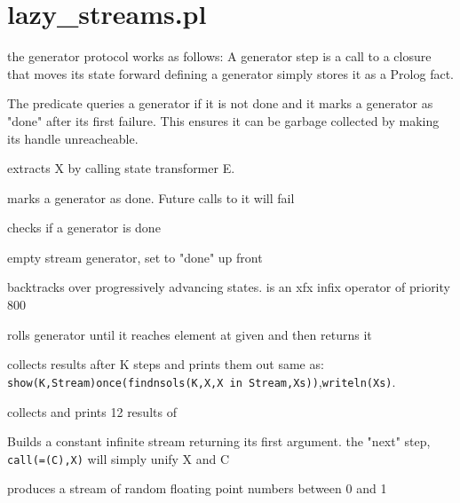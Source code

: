 \documentclass[11pt]{article}
\begin{document}



\section{lazy_streams.pl}

\label{sec:lazystreams}

\begin{description}
the  generator protocol works as follows:
A generator step is a call to a closure that moves its state forward
defining a generator simply stores it as a Prolog fact.

The predicate  queries a generator if it is not done and
it marks a generator as "done" after its first failure.
This ensures it can be garbage collected
by making its handle unreacheable.

 extracts X by calling state transformer E.

 marks a generator as done.
Future calls to it will fail

checks if a generator is done

empty stream generator, set to "done" up front

 backtracks over progressively advancing states.
 is an xfx infix operator of priority 800

rolls generator until it reaches element at given  and then returns it

 collects results after K steps and prints them out
same as: \verb$show(K,Stream)$\Sneck{}\verb$once(findnsols(K,X,X in Stream,Xs))$,\verb$writeln(Xs)$.

collects and prints 12 results of 

Builds a constant infinite stream returning its first argument.
the "next" step, \verb$call(=(C),X)$ will simply unify X and C

produces a stream of random floating point numbers between 0 and 1


\end{description}
\end{document}
